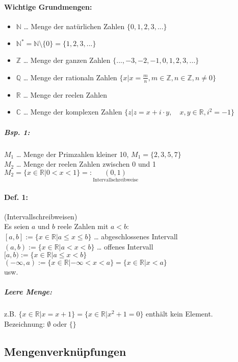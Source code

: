 \paragraph{Wichtige Grundmengen:}
\begin{itemize}
\item $\mathbb{N}$ … Menge der natürlichen Zahlen $\{0,1,2,3,...\}$
\item $\mathbb{N}^*=\mathbb{N}\setminus \{0\} = \{1,2,3,...\}$
\item $\mathbb{Z}$ … Menge der ganzen Zahlen $\{...,-3,-2,-1,0,1,2,3,...\}$
\item $\mathbb{Q}$ … Menge der rationaln Zahlen $\{ x | x = \frac{m}{n}, m\in \mathbb{Z}, n \in \mathbb{Z}, n\not= 0\}$
\item $\mathbb{R}$ … Menge der reelen Zahlen
\item $\mathbb{C}$ … Menge der komplexen Zahlen $\{ z | z=x+ i \cdot  y,\quad x, y \in \mathbb{R}, i^2=-1\}$
\end{itemize}

\subparagraph{Bsp. 1:} \parskp
$M_1$ … Menge der Primzahlen kleiner 10, $M_1=\{2,3,5,7\}$\\
$M_2$ … Menge der reelen Zahlen zwischen 0 und 1 $M_2=\{x \in \mathbb{R}| 0<x<1\} =: \underset{\text{Intervallschreibweise}}{(0,1)}$

\paragraph{Def. 1:} (Intervallschreibweisen) \\
Es seien $a$ und $b$ reele Zahlen mit $a<b$:\\
$[a,b]:=\{ x \in \mathbb{R} | a \le x \le b\}$ … abgeschlossenes Intervall\\
$(a,b):= \{ x \in \mathbb{R} | a < x < b\}$ … offenes Intervall\\
$[a,b):= \{ x \in \mathbb{R}  | a \le x < b\}$\\
$(-\infty , a ) := \{ x \in \mathbb{R} | - \infty < x < a \} = \{x \in \mathbb{R} | x < a\}$\\
usw.

\subparagraph{Leere Menge:} z.B. $\{ x \in \mathbb{R} | x =x+1\}= \{x \in \mathbb{R} | x^2+1=0\}$ enthält kein Element.\\
Bezeichnung: $\emptyset$ oder $\{\}$

\subsection{Mengenverknüpfungen}

